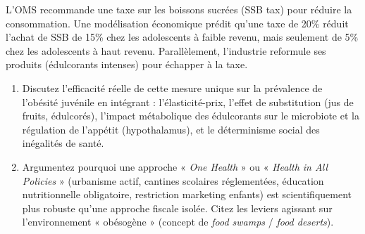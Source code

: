 \documentclass[11pt]{article}
\begin{document}
\begin{exercice}
L'OMS recommande une taxe sur les boissons sucrées (SSB tax) pour réduire la consommation. Une modélisation économique prédit qu'une taxe de 20\% réduit l'achat de SSB de 15\% chez les adolescents à faible revenu, mais seulement de 5\% chez les adolescents à haut revenu. Parallèlement, l'industrie reformule ses produits (édulcorants intenses) pour échapper à la taxe.

\begin{enumerate}
    \item Discutez l'efficacité réelle de cette mesure unique sur la prévalence de l'obésité juvénile en intégrant : l'élasticité-prix, l'effet de substitution (jus de fruits, édulcorés), l'impact métabolique des édulcorants sur le microbiote et la régulation de l'appétit (hypothalamus), et le déterminisme social des inégalités de santé.
    \item Argumentez pourquoi une approche « \textit{One Health} » ou « \textit{Health in All Policies} » (urbanisme actif, cantines scolaires réglementées, éducation nutritionnelle obligatoire, restriction marketing enfants) est scientifiquement plus robuste qu'une approche fiscale isolée. Citez les leviers agissant sur l'environnement « obésogène » (concept de \textit{food swamps} / \textit{food deserts}).
\end{enumerate}
\end{exercice}
\end{document}
